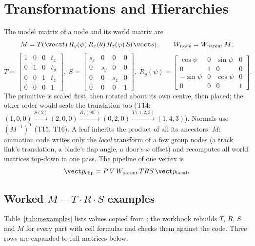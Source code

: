 \section{Transformations and Hierarchies}\label{sec:transform}
The model matrix of a node and its world matrix are
\begin{equation}
  M = T(\vect t)\,R_y(\psi)\,R_x(\theta)\,R_z(\varphi)\,S(\vect s),\qquad
  W_\text{node} = W_\text{parent}\,M ,
\end{equation}
\begin{equation}
  T=\begin{bmatrix}1&0&0&t_x\\0&1&0&t_y\\0&0&1&t_z\\0&0&0&1\end{bmatrix},\;
  S=\begin{bmatrix}s_x&0&0&0\\0&s_y&0&0\\0&0&s_z&0\\0&0&0&1\end{bmatrix},\;
  R_y(\psi)=\begin{bmatrix}\cos\psi&0&\sin\psi&0\\0&1&0&0\\-\sin\psi&0&\cos\psi&0\\0&0&0&1\end{bmatrix}.
\end{equation}
The primitive is scaled first, then rotated about its own centre, then placed; the other order would scale the
translation too (T14: $(1,0,0)\xrightarrow{S(2)}(2,0,0)\xrightarrow{R_z(90^\circ)}(0,2,0)\xrightarrow{T(1,2,3)}(1,4,3)$).
Normals use $(M^{-1})^T$ (T15, T16). A leaf inherits the product of all its ancestors' $M$: animation code writes only the \emph{local} transform of a few group nodes (a track link's translation, a blade's flap angle, a door's $x$ offset) and 
recomputes all world matrices top-down in one pass. The pipeline of one vertex is
\begin{equation}
  \vect p_\text{clip}=P\,V\,W_\text{parent}\,T R S\,\vect p_\text{local}.
\end{equation}

\subsection{Worked $M=T\cdot R\cdot S$ examples}
Table~\ref{tab:mexamples} lists values copied from ; the workbook rebuilds
$T$, $R$, $S$ and $M$ for every part with cell formulas and checks them against the code. Three rows are expanded to full matrices below.

